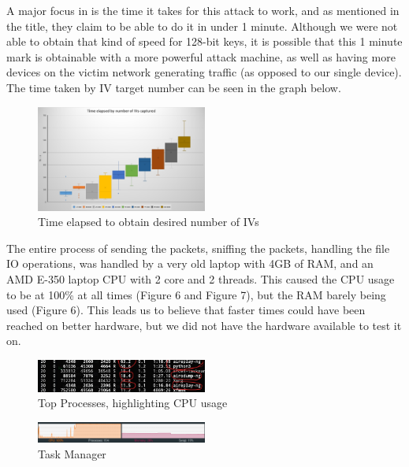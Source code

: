 \documentclass[10pt, titlepage]{article}
\begin{document}
A major focus in \cite{mainPaper} is the time it takes for this attack to work, and as mentioned in the title, they claim to be able to do it in under 1 minute. Although we were not able to obtain that kind of speed for 128-bit keys, it is possible that this 1 minute mark is obtainable with a more powerful attack machine, as well as having more devices on the victim network generating traffic (as opposed to our single device). The time taken by IV target number can be seen in the graph below.

\begin{figure}[H]
 	\centering
    \includegraphics[width=0.5\textwidth]{./images/unknown-3.png}
    \caption{Time elapsed to obtain desired number of IVs}
\end{figure}

The entire process of sending the packets, sniffing the packets, handling the file IO operations, was handled by a very old laptop with 4GB of RAM, and an AMD E-350 laptop CPU with 2 core and 2 threads. This caused the CPU usage to be at 100\% at all times (Figure 6 and Figure 7), but the RAM barely being used (Figure 6). This leads us to believe that faster times could have been reached on better hardware, but we did not have the hardware available to test it on. \\

\begin{figure}[H]
 	\centering
    \includegraphics[width=0.5\textwidth]{./images/top_procs.jpg}
    \caption{Top Processes, highlighting CPU usage}
\end{figure}

\begin{figure}[H]
 	\centering
    \includegraphics[width=0.5\textwidth]{./images/task_manager_process_view.png}
    \caption{Task Manager}
\end{figure}
\end{document}
